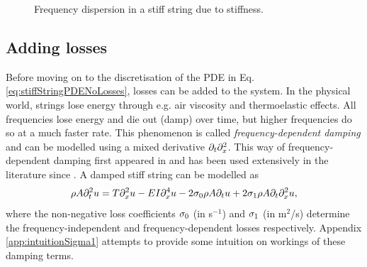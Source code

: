 \begin{figure}[h]
    \caption{Frequency dispersion in a stiff string due to stiffness.\label{fig:dispersion}}
\end{figure}



\subsection{Adding losses}
Before moving on to the discretisation of the PDE in Eq. \eqref{eq:stiffStringPDENoLosses}, losses can be added to the system. In the physical world, strings lose energy through e.g. air viscosity and thermoelastic effects. All frequencies lose energy and die out (damp) over time, but higher frequencies do so at a much faster rate. This phenomenon is called \textit{frequency-dependent damping} and can be modelled using a mixed derivative $\partial_t \partial_x^2$. This way of frequency-dependent damping first appeared in \cite{Bensa2003} and has been used extensively in the literature since \cite{Valimaki2006,theBible}. A damped stiff string can be modelled as
\begin{equation}\label{eq:stiffStringPDE}
    \rho A \partial_t^2 u = T \partial_x^2 u - EI \partial_x^4 u - 2 \sigma_{0} \rho A \partial_t u + 2 \sigma_{1} \rho A\partial_t \partial_x^2 u,
\end{equation}
where the non-negative loss coefficients $\sigma_{0}$ (in s$^{-1}$) and $\sigma_{1}$ (in m$^2$/s) determine the frequency-independent and frequency-dependent losses respectively. Appendix \ref{app:intuitionSigma1} attempts to provide some intuition on workings of these damping terms.

